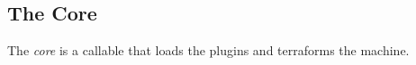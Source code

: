 \subsection{The Core}
\label{core}

The \emph{core} is a callable that loads the plugins and terraforms the machine.